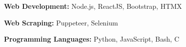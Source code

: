 \begin{onecolentry}
    \textbf{Web Development:} Node.js, ReactJS, Bootstrap, HTMX
\end{onecolentry}
\vspace{0.2 cm}

\begin{onecolentry}
    \textbf{Web Scraping:} Puppeteer, Selenium
\end{onecolentry}
\vspace{0.2 cm}

\begin{onecolentry}
    \textbf{Programming Languages:} Python, JavaScript, Bash, C
\end{onecolentry}
\vspace{0.2 cm}